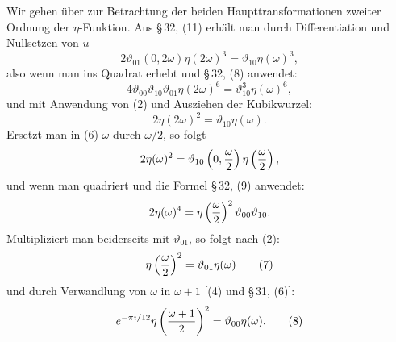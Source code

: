 \documentclass[11pt]{article}
\providecommand{\tht}{\vartheta}
\begin{document}
Wir gehen über zur Betrachtung der beiden Haupttransformationen zweiter Ordnung der $\eta$-Funktion. Aus \S\,32, (11) erhält man durch Differentiation und Nullsetzen von $u$
\[
2\tht_{01}(0,2\omega)\eta(2\omega)^3=\tht_{10}\eta(\omega)^3,
\]
also wenn man ins Quadrat erhebt und \S\,32, (8) anwendet:
\[
4\tht_{00}\tht_{10}\tht_{01}\eta(2\omega)^6=\tht_{10}^3\eta(\omega)^6,
\]
und mit Anwendung von (2) und Ausziehen der Kubikwurzel:
\begin{equation}
2\eta(2\omega)^2=\tht_{10}\eta(\omega). \tag{6}
\end{equation}
Ersetzt man in (6) $\omega$ durch $\omega/2$, so folgt
\[
2\eta(\omega)^2=\tht_{10}\left(0,{\omega\over2}\right)\eta\left({\omega\over2}\right),
\]
und wenn man quadriert und die Formel \S\,32, (9) anwendet:
\[
2\eta(\omega)^4=\eta\left({\omega\over2}\right)^2\tht_{00}\tht_{10}.
\]
Multipliziert man beiderseits mit $\tht_{01}$, so folgt nach (2):
\begin{equation}
\eta\left({\omega\over2}\right)^2=\tht_{01}\eta(\omega) \tag{7}
\end{equation}
und durch Verwandlung von $\omega$ in $\omega+1$ [(4) und \S\,31, (6)]:
\begin{equation}
e^{-\pi i/12}\eta\left({\omega+1\over2}\right)^2=\tht_{00}\eta(\omega). \tag{8}
\end{equation}
\end{document}
